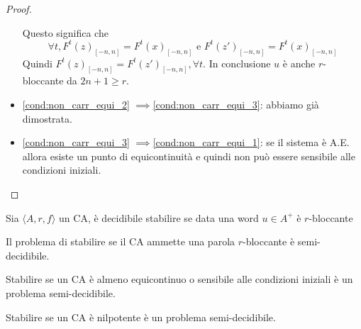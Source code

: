 \begin{teorema}
\begin{proof}
\begin{itemize}
            Questo significa che 
            $$\forall t, F^t(z)_{[-n,n]} = F^t(x)_{[-n,n]}\text{ e } F^t(z')_{[-n,n]} = F^t(x)_{[-n,n]}$$
            Quindi $F^t(z)_{[-n,n]} = F^t(z')_{[-n,n]},\forall t$. In conclusione $u$
            è anche $r$-bloccante da $2n+1\ge r$.
            \item \ref{cond:non_carr_equi_2} $\implies $\ref{cond:non_carr_equi_3}: 
            abbiamo già dimostrata.
            \item \ref{cond:non_carr_equi_3} $\implies $\ref{cond:non_carr_equi_1}: 
            se il sistema è A.E. allora esiste un punto di equicontinuità e quindi
            non può essere sensibile alle condizioni iniziali.
        \end{itemize}
    \end{proof}
\end{teorema}

\begin{teorema}
    Sia $\langle A,r,f\rangle$ un CA, è decidibile stabilire se data una word $u\in A^+$
    è $r$-bloccante
\end{teorema}

\begin{teorema}
    Il problema di stabilire se il CA ammette una parola $r$-bloccante 
    è semi-decidibile.
\end{teorema}

\begin{teorema}
    Stabilire se un CA è almeno equicontinuo o sensibile alle condizioni iniziali 
    è un problema semi-decidibile.
\end{teorema}

\begin{teorema}
    Stabilire se un CA è nilpotente è un problema semi-decidibile.
\end{teorema}

